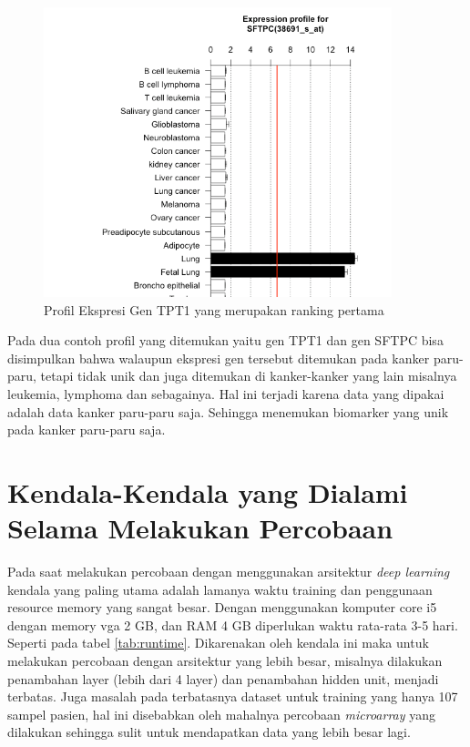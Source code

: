 \begin{figure}
	\centering
	\includegraphics[width=0.9\textwidth]
		{pics/38691_s_at_profil.png}
	\caption{Profil Ekspresi Gen TPT1 yang merupakan ranking pertama}
	\label{fig:SFTPC}
\end{figure}

Pada dua contoh profil yang ditemukan yaitu gen TPT1 dan gen SFTPC bisa disimpulkan bahwa walaupun ekspresi gen tersebut ditemukan pada kanker paru-paru, tetapi tidak unik dan juga ditemukan di kanker-kanker yang lain misalnya leukemia, lymphoma dan sebagainya. Hal ini terjadi karena data yang dipakai adalah data kanker paru-paru saja. Sehingga menemukan biomarker yang unik pada kanker paru-paru saja.
\section{Kendala-Kendala yang Dialami Selama Melakukan Percobaan}
Pada saat melakukan percobaan dengan menggunakan arsitektur \textit{deep learning} kendala yang paling utama adalah lamanya waktu training dan penggunaan resource memory yang sangat besar. Dengan menggunakan komputer core i5 dengan memory vga 2 GB, dan RAM 4 GB diperlukan waktu rata-rata 3-5 hari. Seperti pada tabel \ref{tab:runtime}. Dikarenakan oleh kendala ini maka untuk melakukan percobaan dengan arsitektur yang lebih besar, misalnya dilakukan penambahan layer (lebih dari 4 layer) dan penambahan hidden unit, menjadi terbatas. Juga masalah pada terbatasnya dataset untuk training yang hanya 107 sampel pasien, hal ini disebabkan oleh mahalnya percobaan \textit{microarray} yang dilakukan sehingga sulit untuk mendapatkan data yang lebih besar lagi.

